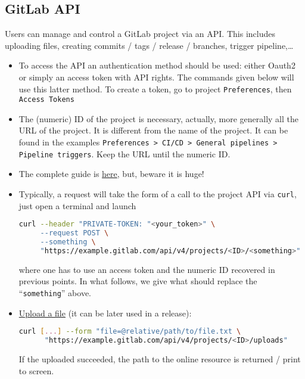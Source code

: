 \documentclass[a4paper,12pt,%
              final%
              ]{article}
\begin{document}
\subsection{GitLab API}
Users can manage and control a GitLab project via an API. This includes uploading files, creating commits / tags / release / branches, trigger pipeline,\ldots
\begin{itemize}
  \item To access the API an authentication method should be used: either Oauth2 or simply an access token with API rights. The commands given below will use this latter method. To create a token, go to project \texttt{Preferences}, then \texttt{Access Tokens}
  \item The (numeric) ID of the project is necessary, actually, more generally all the URL of the project. It is different from the name of the project. It can be found in the examples \texttt{Preferences > CI/CD > General pipelines > Pipeline triggers}. Keep the URL until the numeric ID.
  \item The complete guide is \href{https://docs.gitlab.com/ee/api/}{here}, but, beware it is huge!
  \item Typically, a request will take the form of a call to the project API via \texttt{curl}, just open a terminal and launch
\begin{lstlisting}[language=bash]
curl --header "PRIVATE-TOKEN: "<your_token>" \
     --request POST \
     --something \
     "https://example.gitlab.com/api/v4/projects/<ID>/<something>"
\end{lstlisting}
    where one has to use an access token and the numeric ID recovered in previous points. In what follows, we give what should replace the ``\texttt{something}'' above.
  \item \href{https://docs.gitlab.com/ee/api/projects.html#upload-a-file}{Upload a file} (it can be later used in a release):
\begin{lstlisting}[language=bash]
curl [...] --form "file=@relative/path/to/file.txt \
      "https://example.gitlab.com/api/v4/projects/<ID>/uploads"
\end{lstlisting}
    If the uploaded succeeded, the path to the online resource is returned / print to screen.
\end{itemize}


\end{document}
